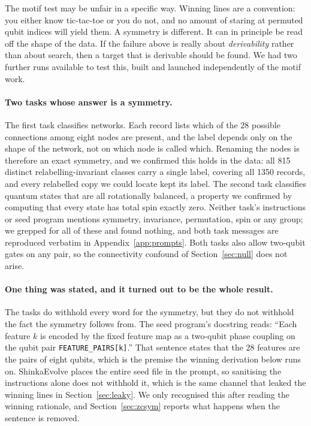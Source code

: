 \documentclass[11pt]{article}
\begin{document}
The motif test may be unfair in a specific way. Winning lines are a convention:
you either know tic-tac-toe or you do not, and no amount of staring at permuted
qubit indices will yield them. A symmetry is different. It can in principle be
read off the shape of the data. If the failure above is really about
\emph{derivability} rather than about search, then a target that is derivable
should be found. We had two further runs available to test this, built and
launched independently of the motif work.

\paragraph{Two tasks whose answer is a symmetry.}
The first task classifies networks. Each record lists which of the 28 possible
connections among eight nodes are present, and the label depends only on the
shape of the network, not on which node is called which. Renaming the nodes is
therefore an exact symmetry, and we confirmed this holds in the data: all 815
distinct relabelling-invariant classes carry a single label, covering all 1350
records, and every relabelled copy we could locate kept its label. The second
task classifies quantum states that are all rotationally balanced, a property we
confirmed by computing that every state has total spin exactly zero. Neither
task's instructions or seed program mentions symmetry, invariance, permutation,
spin or any group; we grepped for all of these and found nothing, and both task
messages are reproduced verbatim in Appendix~\ref{app:prompts}. Both tasks also
allow two-qubit gates on any pair, so the connectivity confound of
Section~\ref{sec:null} does not arise.

\paragraph{One thing was stated, and it turned out to be the whole result.}
The tasks do withhold every word for the symmetry, but they do not withhold the
fact the symmetry follows from. The seed program's docstring reads: ``Each
feature $k$ is encoded by the fixed feature map as a two-qubit phase coupling on
the qubit pair \texttt{FEATURE\_PAIRS[k]}.'' That sentence states that the 28
features are the pairs of eight qubits, which is the premise the winning
derivation below runs on. ShinkaEvolve places the entire seed file in the prompt,
so sanitising the instructions alone does not withhold it, which is the same
channel that leaked the winning lines in Section~\ref{sec:leaky}. We only
recognised this after reading the winning rationale, and Section~\ref{sec:zcsym}
reports what happens when the sentence is removed.
\end{document}
